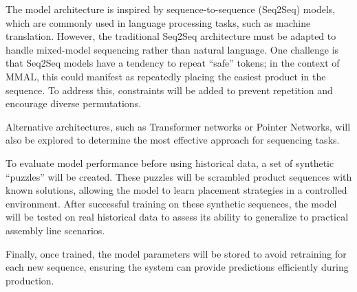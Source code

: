 \documentclass[12pt,a4paper]{report}
\begin{document}
The model architecture is inspired by sequence-to-sequence (Seq2Seq) models, which are commonly used in language processing tasks, such as machine translation. However, the traditional Seq2Seq architecture must be adapted to handle mixed-model sequencing rather than natural language. One challenge is that Seq2Seq models have a tendency to repeat “safe” tokens; in the context of MMAL, this could manifest as repeatedly placing the easiest product in the sequence. To address this, constraints will be added to prevent repetition and encourage diverse permutations. 

Alternative architectures, such as Transformer networks or Pointer Networks, will also be explored to determine the most effective approach for sequencing tasks.  

To evaluate model performance before using historical data, a set of synthetic “puzzles” will be created. These puzzles will be scrambled product sequences with known solutions, allowing the model to learn placement strategies in a controlled environment. After successful training on these synthetic sequences, the model will be tested on real historical data to assess its ability to generalize to practical assembly line scenarios.

Finally, once trained, the model parameters will be stored to avoid retraining for each new sequence, ensuring the system can provide predictions efficiently during production.

\end{document}

